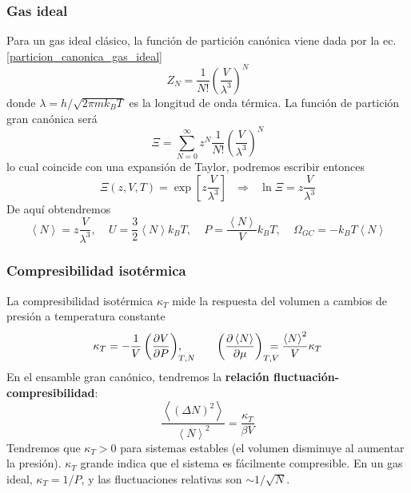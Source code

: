 \documentclass[]{article}
\numberwithin{equation}{section}
\newcommand{\deriv}[3]{\left(\frac{\partial #1}{\partial #2} \right)_{#3}}
\newcommand{\0}{\textcolor{gray}{0}}
\newcommand{\pr}[1]{\left\langle #1 \right\rangle }
\begin{document}
\subsubsection{Gas ideal}
Para un gas ideal clásico, la función de partición canónica viene dada por la ec. \ref{particion_canonica_gas_ideal}
\begin{equation*}
	Z_N = \frac{1}{N!}\left(\dfrac{V}{\lambda^3}\right)^N
\end{equation*}
donde \(\lambda = h/\sqrt{2\pi m k_B T}\) es la longitud de onda térmica. La función de partición gran canónica será
\begin{equation*}
	\Xi = \sum_{N=0}^{\infty} z^N \frac{1}{N!}\left(\dfrac{V}{\lambda^3}\right)^N
\end{equation*}
lo cual coincide con una expansión de Taylor, podremos escribir entonces
\begin{equation}
	\Xi(z,V,T) = \exp\left[z \frac{V}{\lambda^3}\right] ~~~\Rightarrow~~~ \ln\Xi = z \frac{V}{\lambda^3}
\end{equation}
De aquí obtendremos
\begin{equation}
	\pr{N} = z \frac{V}{\lambda^3}, ~~~~~ U = \frac{3}{2}\pr{N} k_B T, ~~~~~ P = \frac{\pr{N}}{V} k_B T, ~~~~~ \Omega_{GC} = -k_B T \pr{N}
\end{equation}

\subsubsection{Compresibilidad isotérmica}
La compresibilidad isotérmica \(\kappa_T\) mide la respuesta del volumen a cambios de presión a temperatura constante
\begin{equation}
	\kappa_T = - \frac{1}{V}\deriv{V}{P}{T,N}\hspace{-6mm}, ~~~~~~~~~ \deriv{\pr{N}}{\mu}{T,V}\hspace{-4mm} = \frac{\pr{N}^2}{V} \kappa_T
\end{equation}
En el ensamble gran canónico, tendremos la \textbf{relación fluctuación-compresibilidad}:
\begin{equation}
	\frac{\left\langle (\Delta N)^2\right\rangle}{\pr{N}^2} = \frac{\kappa_T}{\beta V}
\end{equation}
Tendremos que \(\kappa_T > 0 \) para sistemas estables (el volumen disminuye al aumentar la presión).
\(\kappa_T\) grande indica que el sistema es fácilmente compresible. En un gas ideal, \(\kappa_T = 1/P\), y las fluctuaciones relativas son \(\sim 1/\sqrt{N}\).
\end{document}
